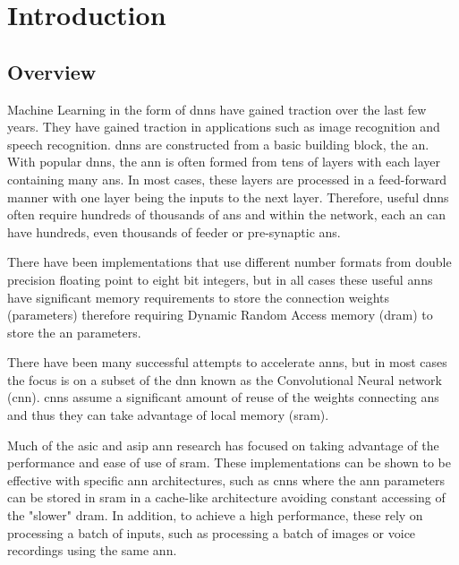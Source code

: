 
\chapter{Introduction}
\label{sec:Introduction}
\label{sec:chap-one}


\section{Overview}
\label{sec:overview}

Machine Learning in the form of \acfp{dnn} have gained traction over the last few years.
They have gained traction in applications such as image recognition and speech recognition.
\acp{dnn} are constructed from a basic building block, the \acf{an}.
With popular \acp{dnn}, the \acf{ann} is often formed from tens of layers with each layer containing many \acp{an}.
In most cases, these layers are processed in a feed-forward manner with one layer being the inputs to the next layer.
Therefore, useful \acp{dnn} often require hundreds of thousands of \acp{an} and within the network, each \ac{an} can have hundreds, even thousands of feeder or pre-synaptic \acp{an}.

There have been implementations that use different number formats from double precision floating point to eight bit integers, but in all cases these useful \ac{ann}s have significant
memory requirements to store the connection weights (parameters) therefore requiring Dynamic Random Access memory (\ac{dram}) to store the \ac{an} parameters.

There have been many successful attempts to accelerate \ac{ann}s, but in most cases the focus is on a subset of the \ac{dnn} known as the Convolutional Neural network (\ac{cnn}).
\acp{cnn} assume a significant amount of reuse of the weights connecting \acp{an} and thus they can take advantage of local memory (\ac{sram}).

Much of the \ac{asic} and \ac{asip} \ac{ann} research has focused on taking advantage of the performance and ease of use of \ac{sram}.
These implementations can be shown to be effective with specific \ac{ann} architectures, such as \ac{cnn}s where the \ac{ann} parameters can be stored in \ac{sram} in a cache-like architecture avoiding constant accessing of the "slower" \ac{dram}.
In addition, to achieve a high performance, these rely on processing a batch of inputs, such as processing a batch of images or voice recordings using the same \ac{ann}.


